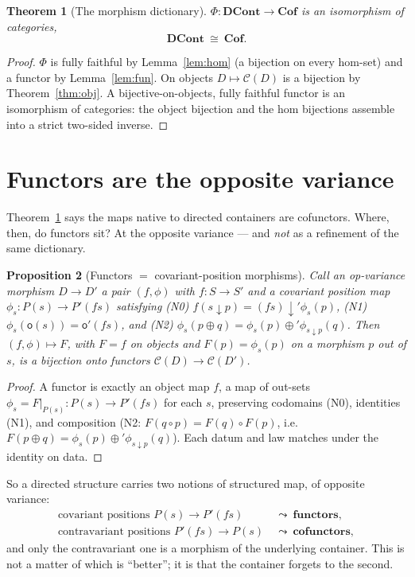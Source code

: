 \documentclass[11pt,a4paper]{amsart}
\newcommand{\Cof}{\mathbf{Cof}}
\newcommand{\DCont}{\mathbf{DCont}}
\theoremstyle{plain}
\newtheorem{theorem}{Theorem}[section]
\newtheorem{proposition}[theorem]{Proposition}
\theoremstyle{definition}
\theoremstyle{remark}
\begin{document}
\begin{theorem}[The morphism dictionary]\label{thm:main}
$\Phi\colon\DCont\to\Cof$ is an isomorphism of categories,
\[
  \DCont\ \cong\ \Cof .
\]
\end{theorem}

\begin{proof}
$\Phi$ is fully faithful by Lemma~\ref{lem:hom} (a bijection on every hom-set) and a
functor by Lemma~\ref{lem:fun}. On objects $D\mapsto\mathcal C(D)$ is a bijection by
Theorem~\ref{thm:obj}. A bijective-on-objects, fully faithful functor is an isomorphism
of categories: the object bijection and the hom bijections assemble into a strict
two-sided inverse.
\end{proof}

\section{Functors are the opposite variance}\label{sec:functors}

Theorem~\ref{thm:main} says the maps native to directed containers are cofunctors. Where,
then, do functors sit? At the opposite variance --- and \emph{not} as a refinement of
the same dictionary.

\begin{proposition}[Functors $=$ covariant-position morphisms]\label{prop:cov}
Call an \emph{op-variance morphism} $D\to D'$ a pair $(f,\phi)$ with $f\colon S\to S'$
and a \emph{covariant} position map $\phi_s\colon P(s)\to P'(fs)$ satisfying
\textup{(N0)} $f(s\downarrow p)=(fs)\downarrow'\phi_s(p)$,
\textup{(N1)} $\phi_s(\mathsf o(s))=\mathsf o'(fs)$, and
\textup{(N2)} $\phi_s(p\oplus q)=\phi_s(p)\oplus'\phi_{s\downarrow p}(q)$.
Then $(f,\phi)\mapsto F$, with $F=f$ on objects and $F(p)=\phi_s(p)$ on a morphism $p$
out of $s$, is a bijection onto functors $\mathcal C(D)\to\mathcal C(D')$.
\end{proposition}

\begin{proof}
A functor is exactly an object map $f$, a map of out-sets
$\phi_s=F|_{P(s)}\colon P(s)\to P'(fs)$ for each $s$, preserving codomains (N0),
identities (N1), and composition (N2: $F(q\circ p)=F(q)\circ F(p)$, i.e.\
$F(p\oplus q)=\phi_s(p)\oplus'\phi_{s\downarrow p}(q)$). Each datum and law matches under
the identity on data.
\end{proof}

So a directed structure carries two notions of structured map, of opposite variance:
\[
  \begin{aligned}
  \text{covariant positions }P(s)\to P'(fs)\ &\leadsto\ \textbf{functors},\\
  \text{contravariant positions }P'(fs)\to P(s)\ &\leadsto\ \textbf{cofunctors},
  \end{aligned}
\]
and only the contravariant one is a morphism of the underlying container. This is not a
matter of which is ``better''; it is that the container forgets to the second.
\end{document}
